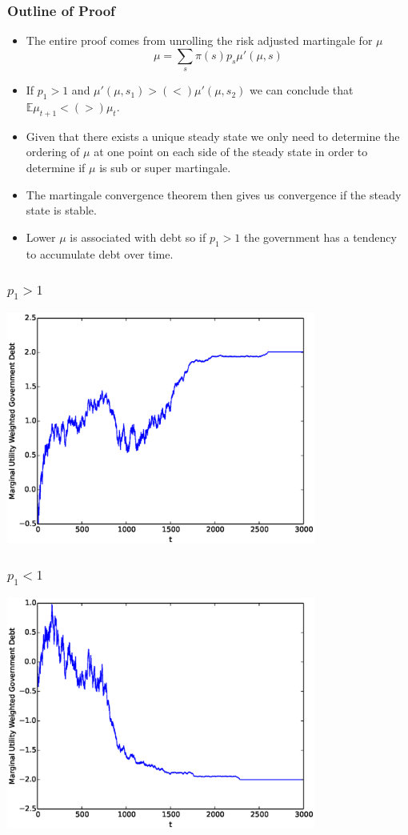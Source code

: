 \documentclass{beamer}
\newcommand{\EE}{\mathbb E}
\begin{document}
 
 \begin{frame}
  \frametitle{Outline of Proof}
  \begin{itemize}
	\item  The entire proof comes from unrolling the risk adjusted martingale for $\mu$
	\[ 
			\mu = \sum_s \pi(s) p_s \mu'(\mu,s)
	\]
	\item  If $p_1 >1$ and $\mu'(\mu,s_1) > (<) \mu'(\mu,s_2)$ we can conclude that $\EE\mu_{t+1} < (>)\mu_t$.
	\item  Given that there exists a unique steady state we only need to determine the ordering of $\mu$ at one point on each side of the steady state in order to determine if $\mu$ is sub or super martingale.
	\item The martingale convergence theorem then gives us convergence if the steady state is stable.
	\item  Lower $\mu$ is associated with debt so if $p_1 > 1$ the government has a tendency to accumulate debt over time.
\end{itemize}
 \end{frame}

\begin{frame}
	\frametitle{$p_1 > 1$}
	\begin{center}
	\includegraphics[width=4in]{Images/port1.eps}
	\end{center}
\end{frame}

\begin{frame}
	\frametitle{$p_1 < 1$}
	\begin{center}
	\includegraphics[width=4in]{Images/port2.eps}
	\end{center}
\end{frame}
\end{document}
